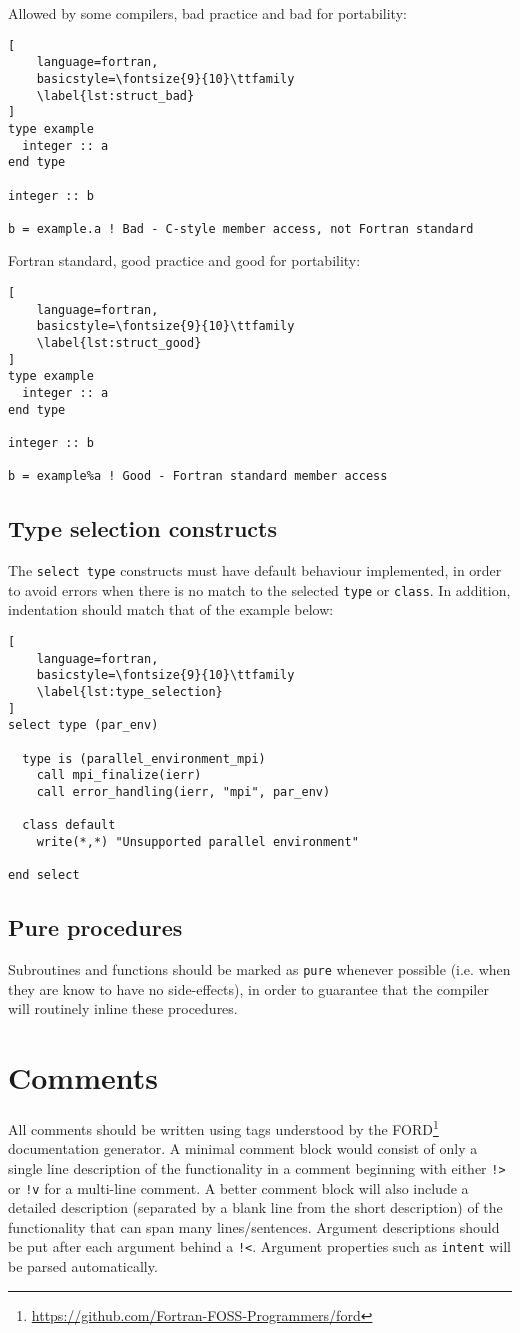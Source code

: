 \documentclass[11pt]{report}
\begin{document}
Allowed by some compilers, bad practice and bad for portability:
\begin{lstlisting}[
	language=fortran,
    basicstyle=\fontsize{9}{10}\ttfamily
    \label{lst:struct_bad}
]
type example
  integer :: a
end type

integer :: b

b = example.a ! Bad - C-style member access, not Fortran standard
\end{lstlisting}

Fortran standard, good practice and good for portability:
\begin{lstlisting}[
	language=fortran,
    basicstyle=\fontsize{9}{10}\ttfamily
    \label{lst:struct_good}
]
type example
  integer :: a
end type

integer :: b

b = example%a ! Good - Fortran standard member access
\end{lstlisting}

\subsection{Type selection constructs}
The \texttt{select type} constructs must have default behaviour implemented, in order to avoid errors when there is no match 
to the selected \texttt{type} or \texttt{class}. In addition, indentation should match that of the example below:

\begin{lstlisting}[
	language=fortran,
    basicstyle=\fontsize{9}{10}\ttfamily
    \label{lst:type_selection}
]
select type (par_env)

  type is (parallel_environment_mpi)   
    call mpi_finalize(ierr)
    call error_handling(ierr, "mpi", par_env)

  class default
    write(*,*) "Unsupported parallel environment"

end select
\end{lstlisting}

\subsection{Pure procedures}
Subroutines and functions should be marked as \texttt{pure} whenever possible (i.e. when they are know to have no side-effects), 
in order to guarantee that the compiler will routinely inline these procedures.

\section{Comments}
All comments should be written using tags understood by the FORD\footnote{\url{https://github.com/Fortran-FOSS-Programmers/ford}} documentation generator. A minimal comment
block would consist of only a single line description of the functionality in a comment beginning with either \texttt{!>} or \texttt{!v} for a multi-line comment. A better comment
block will also include a detailed description (separated by a blank line from the short description) of the functionality that can span many 
lines/sentences. 
Argument descriptions should be put after each argument behind a \texttt{!<}. Argument properties such as \texttt{intent} will be parsed automatically.
\end{document}

